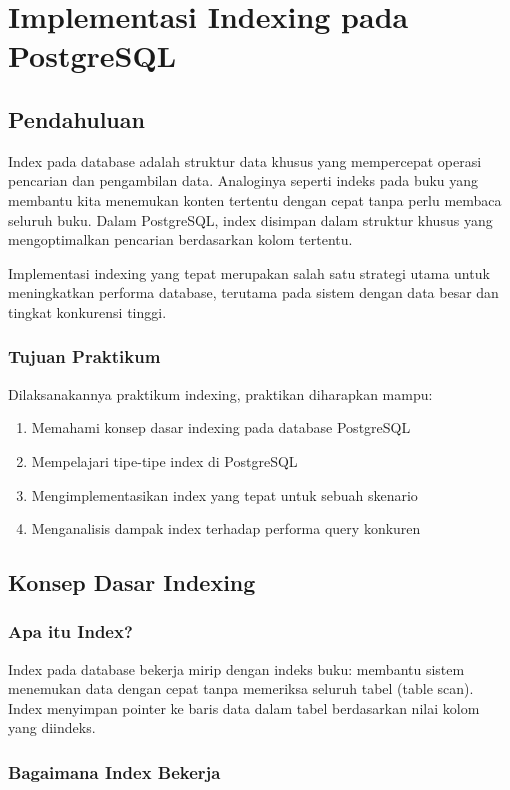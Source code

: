 \chapter{Implementasi Indexing pada PostgreSQL}
\section{Pendahuluan}
Index pada database adalah struktur data khusus yang mempercepat operasi pencarian dan pengambilan data. Analoginya seperti indeks pada buku yang membantu kita menemukan konten tertentu dengan cepat tanpa perlu membaca seluruh buku. Dalam PostgreSQL, index disimpan dalam struktur khusus yang mengoptimalkan pencarian berdasarkan kolom tertentu.

Implementasi indexing yang tepat merupakan salah satu strategi utama untuk meningkatkan performa database, terutama pada sistem dengan data besar dan tingkat konkurensi tinggi.

\subsection{Tujuan Praktikum}
Dilaksanakannya praktikum indexing, praktikan diharapkan mampu:
\begin{enumerate}
    \item Memahami konsep dasar indexing pada database PostgreSQL
    \item Mempelajari tipe-tipe index di PostgreSQL
    \item Mengimplementasikan index yang tepat untuk sebuah skenario
    \item Menganalisis dampak index terhadap performa query konkuren
\end{enumerate}

\section{Konsep Dasar Indexing}

\subsection{Apa itu Index?}
Index pada database bekerja mirip dengan indeks buku: membantu sistem menemukan data dengan cepat tanpa memeriksa seluruh tabel (table scan). Index menyimpan pointer ke baris data dalam tabel berdasarkan nilai kolom yang diindeks.

\subsection{Bagaimana Index Bekerja}


